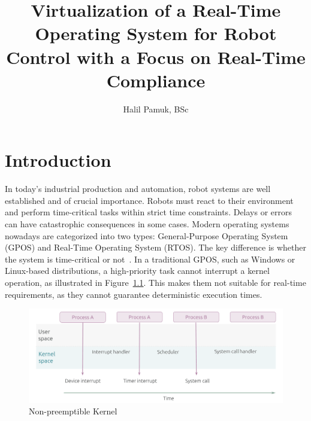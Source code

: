 \documentclass[MMR,Master,english]{style/twbook}
\title{Virtualization of a Real-Time Operating System for Robot Control with a Focus on Real-Time Compliance}
\author{Halil Pamuk, BSc}
\begin{document}
\maketitle
%
%
%



\chapter{Introduction}\label{cha:introduction}
In today's industrial production and automation, robot systems are well established and of crucial importance. Robots must react to their environment and perform time-critical tasks within strict time constraints. Delays or errors can have catastrophic consequences in some cases. Modern operating systems nowadays are categorized into two types:  General-Purpose Operating System (GPOS) and Real-Time Operating System (RTOS). The key difference is whether the system is time-critical or not~\cite{canbazPerformanceAnalysisRealtime2022}. In a traditional GPOS, such as Windows or Linux-based distributions, a high-priority task cannot interrupt a kernel operation, as illustrated in Figure~\ref{fig:kernel_generic}. This makes them not suitable for real-time requirements, as they cannot guarantee deterministic execution times.

\begin{figure}[H]
	\centering
	\includegraphics[width=0.75\columnwidth]{img/introduction/kernel_generic.png}
	\caption[Non-preemptible Kernel]{Non-preemptible Kernel~\cite{WhatRealtimeLinux}}
	\label{fig:kernel_generic}
\end{figure}
\end{document}
